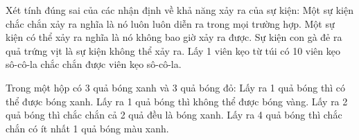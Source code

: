 \begin{ex} %
Xét tính đúng sai của các nhận định về khả năng xảy ra của sự kiện:
\choiceTF
{\True Một sự kiện chắc chắn xảy ra nghĩa là nó luôn luôn diễn ra trong mọi trường hợp.}
{Một sự kiện có thể xảy ra nghĩa là nó không bao giờ xảy ra được.}
{\True Sự kiện con gà đẻ ra quả trứng vịt là sự kiện không thể xảy ra.}
{\True Lấy 1 viên kẹo từ túi có 10 viên kẹo sô-cô-la chắc chắn được viên kẹo sô-cô-la.}
\end{ex}

\begin{ex} %
Trong một hộp có 3 quả bóng xanh và 3 quả bóng đỏ:
\choiceTF
{\True Lấy ra 1 quả bóng thì có thể được bóng xanh.}
{\True Lấy ra 1 quả bóng thì không thể được bóng vàng.}
{Lấy ra 2 quả bóng thì chắc chắn cả 2 quả đều là bóng xanh.}
{\True Lấy ra 4 quả bóng thì chắc chắn có ít nhất 1 quả bóng màu xanh.}
\end{ex}

